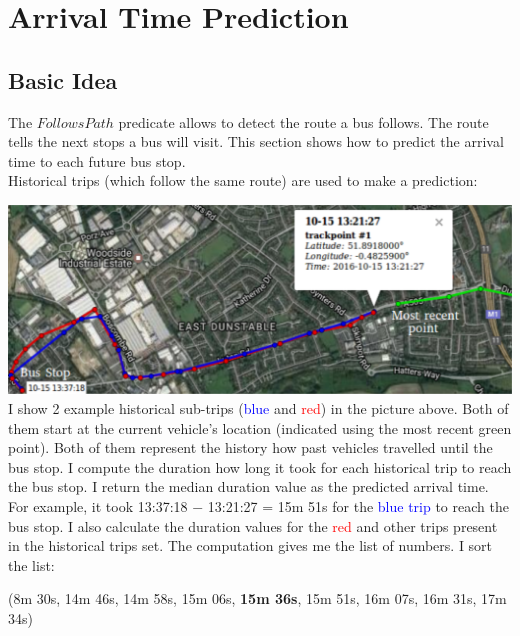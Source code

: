 \documentclass[12pt,a4paper,oneside,openright]{report}
\begin{document}
\newpage

\section{Arrival Time Prediction}

\subsection{Basic Idea}

The $FollowsPath$ predicate allows to detect the route a bus follows.
The route tells the next stops a bus will visit. This section shows how to
predict the arrival time to each future bus stop. \\

Historical trips (which follow the same route) are used to make a prediction:

\includegraphics[width=\textwidth]{figs/future_stop.png} \\

I show 2 example historical sub-trips (\textcolor{blue}{blue} and \textcolor{red}{red})
in the picture above. Both of them start at the current vehicle's location (indicated
using the most recent green point). Both of them represent the history how past
vehicles travelled until the bus stop. I compute the duration how long it
took for each historical trip to reach the bus stop. I return the median duration value
as the predicted arrival time. \\

For example, it took 13:37:18 $-$ 13:21:27 = 15m 51s for the
\textcolor{blue}{blue trip} to reach the bus stop. I also calculate the
duration values for the \textcolor{red}{red} and other trips present in the
historical trips set. The computation gives me the list of numbers.
I sort the list:

\:
\:

(8m 30s, 14m 46s, 14m 58s, 15m 06s, \textbf{15m 36s}, 15m 51s, 16m 07s, 16m 31s,
 17m 34s)
\end{document}
